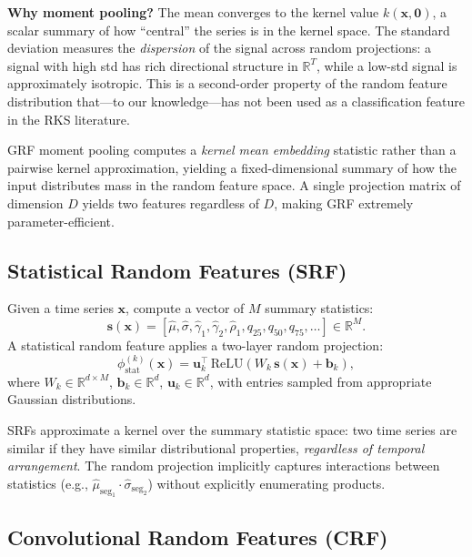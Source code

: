 \documentclass{article}
\begin{document}
\textbf{Why moment pooling?}
The mean converges to the kernel value $k(\mathbf{x}, \mathbf{0})$, a scalar summary of how ``central'' the series is in the kernel space.
The standard deviation measures the \emph{dispersion} of the signal across random projections: a signal with high std has rich directional structure in $\mathbb{R}^T$, while a low-std signal is approximately isotropic.
This is a second-order property of the random feature distribution that---to our knowledge---has not been used as a classification feature in the RKS literature.

GRF moment pooling computes a \emph{kernel mean embedding} statistic rather than a pairwise kernel approximation, yielding a fixed-dimensional summary of how the input distributes mass in the random feature space.
A single projection matrix of dimension $D$ yields two features regardless of $D$, making GRF extremely parameter-efficient.

\subsection{Statistical Random Features (SRF)}

Given a time series $\mathbf{x}$, compute a vector of $M$ summary statistics:
\begin{equation}
  \mathbf{s}(\mathbf{x}) = [\hat{\mu}, \hat{\sigma}, \hat{\gamma}_1, \hat{\gamma}_2, \hat{\rho}_1, q_{25}, q_{50}, q_{75}, \ldots] \in \mathbb{R}^M.
\end{equation}
A statistical random feature applies a two-layer random projection:
\begin{equation}
  \phi_{\mathrm{stat}}^{(k)}(\mathbf{x}) = \mathbf{u}_k^\top \,\mathrm{ReLU}(W_k\,\mathbf{s}(\mathbf{x}) + \mathbf{b}_k),
  \label{eq:srf}
\end{equation}
where $W_k \in \mathbb{R}^{d \times M}$, $\mathbf{b}_k \in \mathbb{R}^d$, $\mathbf{u}_k \in \mathbb{R}^d$, with entries sampled from appropriate Gaussian distributions.

SRFs approximate a kernel over the summary statistic space: two time series are similar if they have similar distributional properties, \emph{regardless of temporal arrangement}.
The random projection implicitly captures interactions between statistics (e.g., $\hat{\mu}_{\mathrm{seg}_1} \cdot \hat{\sigma}_{\mathrm{seg}_2}$) without explicitly enumerating products.

\subsection{Convolutional Random Features (CRF)}
\end{document}
